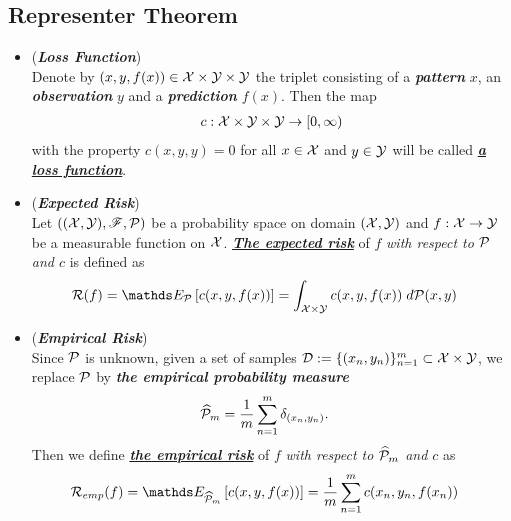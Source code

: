 \documentclass[11pt]{article}
\begin{document}
\subsection{Representer Theorem}
\begin{itemize}
\item \begin{definition} (\emph{\textbf{Loss Function}})\\
Denote by $(x, y, f(x)) \in {\mathcal X} \times {\mathcal Y} \times {\mathcal Y}$ the triplet consisting of a \emph{\textbf{pattern}} $x$, an \emph{\textbf{observation}} $y$ and a \emph{\textbf{prediction}} $f(x)$. Then the map
\begin{align*}
c : {\mathcal X} \times {\mathcal Y} \times {\mathcal Y} \rightarrow [0, \infty)
\end{align*}
with the property $c(x, y, y) = 0$ for all $x \in {\mathcal X}$ and $y \in {\mathcal Y}$ will be called \underline{\emph{\textbf{a loss function}}}.
\end{definition}

\item \begin{definition} (\emph{\textbf{Expected Risk}}) \\
Let $(({\mathcal X}, {\mathcal Y}), {\mathscr F}, {\mathcal P})$ be a probability space on domain $({\mathcal X}, {\mathcal Y})$ and $f: {\mathcal X} \rightarrow {\mathcal Y}$ be a measurable function on ${\mathcal X}$.  \underline{\emph{\textbf{The expected risk}}} of $f$ \emph{with respect to ${\mathcal P}$ and $c$} is defined as 
\begin{align*}
\cR(f) &= \E{\cP}{c(x, y, f(x))} = \int_{\cX \times \cY} c(x, y, f(x)) \; d\cP(x, y)
\end{align*}
\end{definition} 


\item \begin{definition} (\emph{\textbf{Empirical Risk}}) \\
Since ${\mathcal P}$ is unknown, given a set of samples ${\mathcal D} := \{(x_n, y_n) \}_{n=1}^{m} \subset {\mathcal X} \times {\mathcal Y}$, we replace ${\mathcal P}$ by \emph{\textbf{the empirical probability measure}}
\begin{align*}
\widehat{{\mathcal P}}_{m} &=\frac{1}{m} \sum_{n=1}^{m}\delta_{(x_n, y_n)}.
\end{align*} Then we define \underline{\emph{\textbf{the empirical risk}}} of $f$ \emph{with respect to $\widehat{{\mathcal P}}_{m}$ and $c$}  as 
\begin{align*}
\cR_{emp}(f) &= \E{\widehat{\cP}_{m}}{c(x, y, f(x))} =\frac{1}{m} \sum_{n=1}^{m}c(x_n, y_n, f(x_n)) 
\end{align*}
\end{definition}


\end{itemize}
\end{document}
